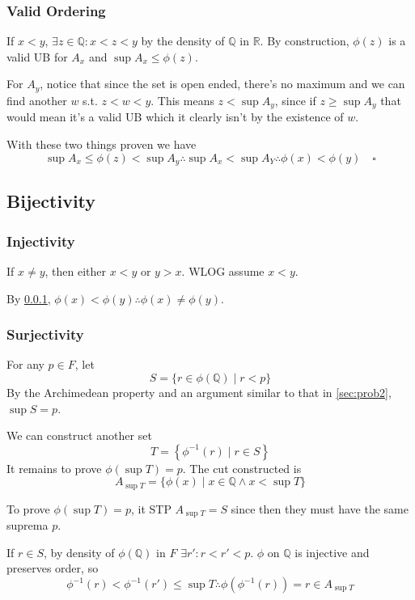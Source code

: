 \documentclass[12pt]{article}
\newcommand{\R}{\mathbb{R}}
\newcommand{\Q}{\mathbb{Q}}
\begin{document}
\subsubsection{Valid Ordering} \label{sec:ordering}

If $x < y$, $\exists z \in \Q: x < z < y$ by the density of $\Q$ in $\R$.
By construction, $\phi(z)$ is a valid UB for $A_x$ and $\sup A_x \le \phi(z)$.

For $A_y$, notice that since the set is open ended, there's no maximum
and we can find another $w$ s.t. $z < w < y$.
This means $z < \sup A_y$, since if $z \ge \sup A_y$
that would mean it's a valid UB which it clearly isn't by the existence of $w$.

With these two things proven we have
\[\sup A_x \le \phi(z) < \sup A_y \therefore \sup A_x < \sup A_Y \therefore \phi(x) < \phi(y)\quad\square\]

\pagebreak

\subsection{Bijectivity}

\subsubsection{Injectivity}

If $x \ne y$, then either $x < y$ or $y > x$.
WLOG assume $x < y$.

By \ref{sec:ordering}, $\phi(x) < \phi(y) \therefore \phi(x) \ne \phi(y)$.

\subsubsection{Surjectivity}

For any $p \in F$, let
\[S=\{r \in \phi(\Q) \mid r < p\}\]
By the Archimedean property and an argument similar to that in \ref{sec:prob2}, $\sup S=p$.

We can construct another set
\[T=\left\{\phi^{-1}(r) \mid r \in S\right\}\]
It remains to prove $\phi(\sup T)=p$.
The cut constructed is
\[A_{\sup T}=\{\phi(x) \mid x \in \Q \land x < \sup T\}\]

To prove $\phi(\sup T)=p$, it STP $A_{\sup T}=S$ since then they must have the same suprema $p$.

If $r \in S$, by density of $\phi(\Q)$ in $F$ $\exists r': r < r' < p$.
$\phi$ on $\Q$ is injective and preserves order, so
\[\phi^{-1}(r) < \phi^{-1}(r') \le \sup T \therefore \phi\left(\phi^{-1}(r)\right)=r \in A_{\sup T}\]
\end{document}
